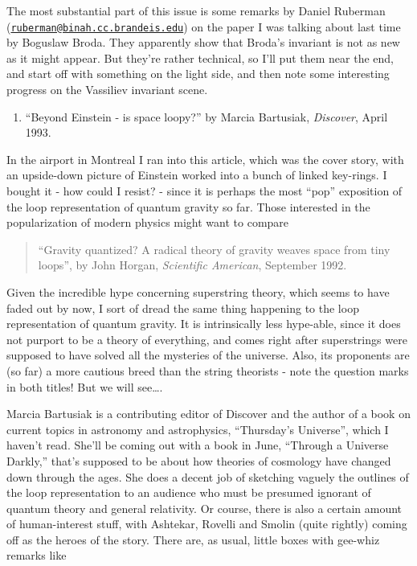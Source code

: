 \documentclass{article}
\def\tightlist{}
\begin{document}
The most substantial part of this issue is some remarks by Daniel
Ruberman
(\href{mailto:ruberman@binah.cc.brandeis.edu}{\nolinkurl{ruberman@binah.cc.brandeis.edu}})
on the paper I was talking about last time by Boguslaw Broda. They
apparently show that Broda's invariant is not as new as it might appear.
But they're rather technical, so I'll put them near the end, and start
off with something on the light side, and then note some interesting
progress on the Vassiliev invariant scene.

\begin{enumerate}
\def\labelenumi{\arabic{enumi})}
\tightlist
\item
  ``Beyond Einstein - is space loopy?'' by Marcia Bartusiak,
  \emph{Discover}, April 1993.
\end{enumerate}

In the airport in Montreal I ran into this article, which was the cover
story, with an upside-down picture of Einstein worked into a bunch of
linked key-rings. I bought it - how could I resist? - since it is
perhaps the most ``pop'' exposition of the loop representation of
quantum gravity so far. Those interested in the popularization of modern
physics might want to compare

\begin{quote}
``Gravity quantized? A radical theory of gravity weaves space from tiny
loops'', by John Horgan, \emph{Scientific American}, September 1992.
\end{quote}

Given the incredible hype concerning superstring theory, which seems to
have faded out by now, I sort of dread the same thing happening to the
loop representation of quantum gravity. It is intrinsically less
hype-able, since it does not purport to be a theory of everything, and
comes right after superstrings were supposed to have solved all the
mysteries of the universe. Also, its proponents are (so far) a more
cautious breed than the string theorists - note the question marks in
both titles! But we will see\ldots.

Marcia Bartusiak is a contributing editor of Discover and the author of
a book on current topics in astronomy and astrophysics, ``Thursday's
Universe'', which I haven't read. She'll be coming out with a book in
June, ``Through a Universe Darkly,'' that's supposed to be about how
theories of cosmology have changed down through the ages. She does a
decent job of sketching vaguely the outlines of the loop representation
to an audience who must be presumed ignorant of quantum theory and
general relativity. Or course, there is also a certain amount of
human-interest stuff, with Ashtekar, Rovelli and Smolin (quite rightly)
coming off as the heroes of the story. There are, as usual, little boxes
with gee-whiz remarks like
\end{document}

